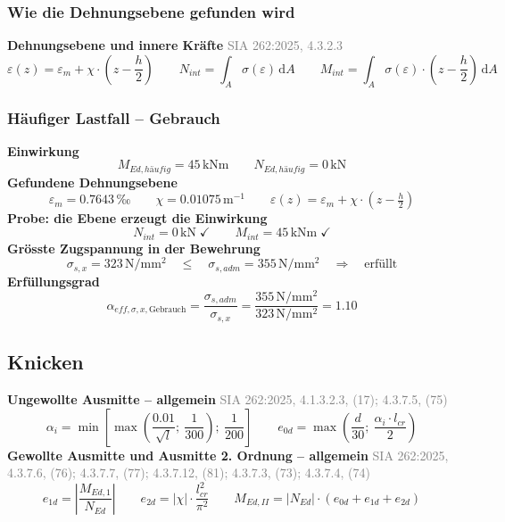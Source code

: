 \documentclass[11pt,a4paper]{article}
\newcommand{\normref}[1]{{\small\textcolor{gray}{#1}}}
\begin{document}
\subsubsection{Wie die Dehnungsebene gefunden wird}
\noindent\textbf{Dehnungsebene und innere Kräfte} \hfill \normref{SIA 262:2025, 4.3.2.3}
\begin{equation*}
\varepsilon(z) = \varepsilon_m + \chi \cdot \left(z - \frac{h}{2}\right) \qquad N_{int} = \int_A \sigma\left(\varepsilon\right)\,\mathrm{d}A \qquad M_{int} = \int_A \sigma\left(\varepsilon\right) \cdot \left(z - \frac{h}{2}\right)\,\mathrm{d}A
\end{equation*}
\subsubsection{Häufiger Lastfall – Gebrauch}
\noindent\textbf{Einwirkung}
\begin{equation*}
M_{Ed,häufig} = 45\,\mathrm{kNm} \qquad N_{Ed,häufig} = 0\,\mathrm{kN}
\end{equation*}
\noindent\textbf{Gefundene Dehnungsebene}
\begin{equation*}
\varepsilon_m = 0.7643\,\text{‰} \qquad \chi = 0.01075\,\mathrm{m}^{-1} \qquad \varepsilon(z) = \varepsilon_m + \chi \cdot \left(z - \tfrac{h}{2}\right)
\end{equation*}
\noindent\textbf{Probe: die Ebene erzeugt die Einwirkung}
\begin{equation*}
N_{int} = 0\,\mathrm{kN} \;\checkmark \qquad M_{int} = 45\,\mathrm{kNm} \;\checkmark
\end{equation*}
\noindent\textbf{Grösste Zugspannung in der Bewehrung}
\begin{equation*}
\sigma_{s,x} = 323\,\mathrm{N}/\mathrm{mm}^{2} \quad \le \quad \sigma_{s,adm} = 355\,\mathrm{N}/\mathrm{mm}^{2} \quad \Rightarrow \quad \text{erfüllt}
\end{equation*}
\noindent\textbf{Erfüllungsgrad}
\begin{equation*}
\alpha_{eff,\sigma,x,\text{Gebrauch}} = \frac{\sigma_{s,adm}}{\sigma_{s,x}} = \frac{355\,\mathrm{N}/\mathrm{mm}^{2}}{323\,\mathrm{N}/\mathrm{mm}^{2}} = 1.10
\end{equation*}
\subsection{Knicken}
\noindent\textbf{Ungewollte Ausmitte – allgemein} \hfill \normref{SIA 262:2025, 4.1.3.2.3, (17); 4.3.7.5, (75)}
\begin{equation*}
\alpha_i = \min\left[\max\left(\frac{0.01}{\sqrt{l}};\ \frac{1}{300}\right);\ \frac{1}{200}\right] \qquad e_{0d} = \max\left(\frac{d}{30};\ \frac{\alpha_i \cdot l_{cr}}{2}\right)
\end{equation*}
\noindent\textbf{Gewollte Ausmitte und Ausmitte 2. Ordnung – allgemein} \hfill \normref{SIA 262:2025, 4.3.7.6, (76); 4.3.7.7, (77); 4.3.7.12, (81); 4.3.7.3, (73); 4.3.7.4, (74)}
\begin{equation*}
e_{1d} = \left|\frac{M_{Ed,1}}{N_{Ed}}\right| \qquad e_{2d} = \left|\chi\right| \cdot \frac{l_{cr}^{2}}{\pi^{2}} \qquad M_{Ed,II} = \left|N_{Ed}\right| \cdot \left(e_{0d} + e_{1d} + e_{2d}\right)
\end{equation*}
\end{document}
